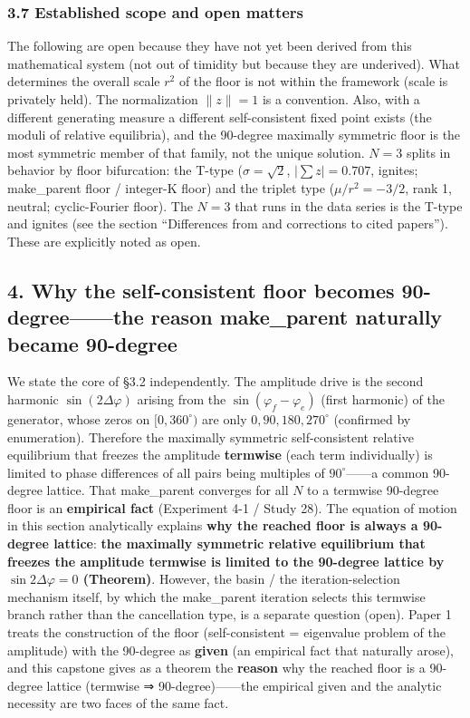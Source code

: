 \documentclass[
  a4paper,
]{ltjsarticle}
\begin{document}
\subsubsection{3.7 Established scope and open
matters}\label{established-scope-and-open-matters}

The following are open because they have not yet been derived from this
mathematical system (not out of timidity but because they are
underived). What determines the overall scale \(r^2\) of the floor is
not within the framework (scale is privately held). The normalization
\(\|z\|=1\) is a convention. Also, with a different generating measure a
different self-consistent fixed point exists (the moduli of relative
equilibria), and the 90-degree maximally symmetric floor is the most
symmetric member of that family, not the unique solution. \(N=3\) splits
in behavior by floor bifurcation: the T-type (\(\sigma=\sqrt2\),
\(|\sum z|=0.707\), ignites; make\_parent floor / integer-K floor) and
the triplet type (\(\mu/r^2=-3/2\), rank 1, neutral; cyclic-Fourier
floor). The \(N=3\) that runs in the data series is the T-type and
ignites (see the section ``Differences from and corrections to cited
papers''). These are explicitly noted as open.

\subsection{4. Why the self-consistent floor becomes 90-degree------the
reason make\_parent naturally became
90-degree}\label{why-the-self-consistent-floor-becomes-90-degreethe-reason-make_parent-naturally-became-90-degree}

We state the core of §3.2 independently. The amplitude drive is the
second harmonic \(\sin(2\Delta\varphi)\) arising from the
\(\sin(\varphi_f-\varphi_e)\) (first harmonic) of the generator, whose
zeros on \([0,360^\circ)\) are only \(0,90,180,270^\circ\) (confirmed by
enumeration). Therefore the maximally symmetric self-consistent relative
equilibrium that freezes the amplitude \textbf{termwise} (each term
individually) is limited to phase differences of all pairs being
multiples of \(90^\circ\)------a common 90-degree lattice. That
make\_parent converges for all \(N\) to a termwise 90-degree floor is an
\textbf{empirical fact} (Experiment 4-1 / Study 28). The equation of
motion in this section analytically explains \textbf{why the reached
floor is always a 90-degree lattice}: \textbf{the maximally symmetric
relative equilibrium that freezes the amplitude termwise is limited to
the 90-degree lattice by \(\sin2\Delta\varphi=0\) (Theorem)}. However,
the basin / the iteration-selection mechanism itself, by which the
make\_parent iteration selects this termwise branch rather than the
cancellation type, is a separate question (open). Paper 1 treats the
construction of the floor (self-consistent = eigenvalue problem of the
amplitude) with the 90-degree as \textbf{given} (an empirical fact that
naturally arose), and this capstone gives as a theorem the
\textbf{reason} why the reached floor is a 90-degree lattice (termwise ⇒
90-degree)------the empirical given and the analytic necessity are two
faces of the same fact.
\end{document}
